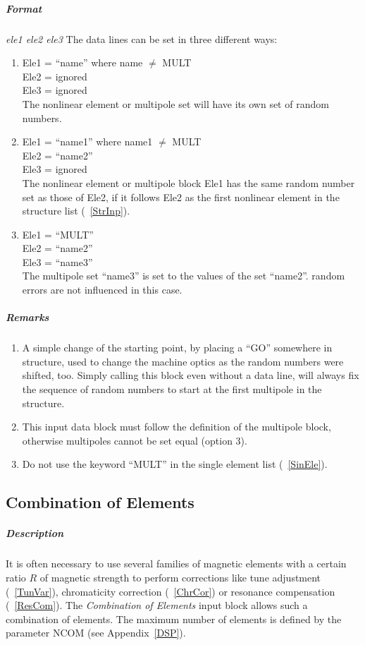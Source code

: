 \subparagraph{Format} {\em ele1 ele2 ele3} \/The data lines can be set
in three different ways:
\begin{enumerate}
\item Ele1 = ``name'' where name $\ne$ MULT \\
  Ele2 = ignored \\
  Ele3 = ignored \\
  The nonlinear element or multipole set will have its own set of
  random numbers.
\item Ele1 = ``name1'' where name1 $\ne$ MULT \\
  Ele2 = ``name2'' \\
  Ele3 = ignored \\
  The nonlinear element or multipole block Ele1 has the same random
  number set as those of Ele2, if it follows Ele2 as the first
  nonlinear element in the structure list (~\ref{StrInp}).
\item Ele1 = ``MULT'' \\
  Ele2 = ``name2'' \\
  Ele3 = ``name3'' \\
  The multipole set ``name3'' is set to the values of the set
  ``name2''. random errors are not influenced in this case.
\end{enumerate}

\subparagraph{Remarks}
\begin{enumerate}
\item A simple change of the starting point, by placing a ``GO''
  somewhere in structure, used to change the machine optics as the
  random numbers were shifted, too.  Simply calling this block even
  without a data line, will always fix the sequence of random numbers
  to start at the first multipole in the structure.
\item This input data block must follow the definition of the
  multipole block, otherwise multipoles cannot be set equal (option
  3).
\item Do not use the keyword ``MULT'' in the single element list
  (~\ref{SinEle}).
\end{enumerate}

\subsection{Combination of Elements} \label{ComEle}

\subparagraph{Description} It is often necessary to use several
families of magnetic elements with a certain ratio $ R $ of magnetic
strength to perform corrections like tune adjustment (~\ref{TunVar}),
chromaticity correction (~\ref{ChrCor}) or resonance compensation
(~\ref{ResCom}).  The {\em Combination of Elements} \/input block
allows such a combination of elements.  The maximum number of elements
is defined by the parameter NCOM (see Appendix~\ref{DSP}).

